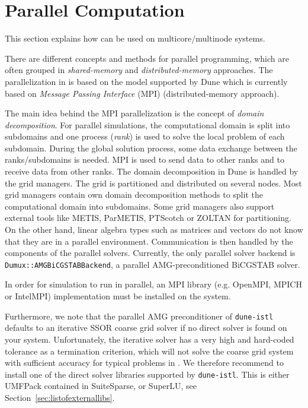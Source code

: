 \section{Parallel Computation}
\label{sec:parallelcomputation}
This section explains how \Dumux can be used
on multicore/multinode systems.

There are different concepts and methods for parallel programming, which are
often grouped in \textit{shared-memory} and \textit{distributed-memory}
approaches. The parallelization in \Dumux is based on the model supported by Dune which is currently based on
\textit{Message Passing Interface} (MPI) (distributed-memory approach).

The main idea behind the MPI parallelization is the concept of \textit{domain
decomposition}. For parallel simulations, the computational domain is split into
subdomains and one process (\textit{rank}) is used to solve the local problem of each
subdomain. During the global solution process, some data exchange between the
ranks/subdomains is needed. MPI is used to send data to other ranks and to receive
data from other ranks. The domain decomposition in Dune is handled by the grid managers.
The grid is partitioned and distributed on several nodes. Most grid managers contain own domain decomposition methods to split the
computational domain  into subdomains. Some grid managers also support external
tools like METIS, ParMETIS, PTScotch or ZOLTAN for partitioning.
On the other hand, linear algebra types such as matrices and vectors
do not know that they are in a parallel environment. Communication is then handled by the components of the
parallel solvers. Currently, the only parallel solver backend is \texttt{Dumux::AMGBiCGSTABBackend}, a parallel AMG-preconditioned
BiCGSTAB solver.

In order for \Dumux simulation to run in parallel, an
MPI library (e.g. OpenMPI, MPICH or IntelMPI) implementation
must be installed on the system.

Furthermore, we note that the parallel AMG preconditioner of \texttt{dune-istl}
defaults to an iterative SSOR coarse grid solver if no direct solver is found on your system. Unfortunately,
the iterative solver has a very high and hard-coded tolerance as a termination criterion, which will not solve
the coarse grid system with sufficient accuracy for typical problems in \Dumux. We therefore recommend
to install one of the direct solver libraries supported by \texttt{dune-istl}. This is either UMFPack contained
in SuiteSparse, or SuperLU, see Section~\ref{sec:listofexternallibs}.

